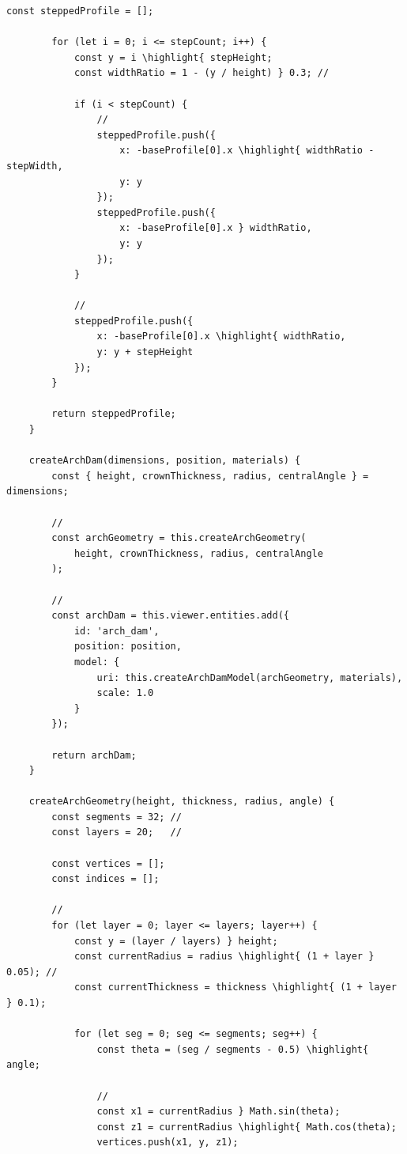 \begin{lstlisting}[style=javascript]
        const steppedProfile = [];
        
        for (let i = 0; i <= stepCount; i++) {
            const y = i \highlight{ stepHeight;
            const widthRatio = 1 - (y / height) } 0.3; // 
            
            if (i < stepCount) {
                // 
                steppedProfile.push({
                    x: -baseProfile[0].x \highlight{ widthRatio - stepWidth,
                    y: y
                });
                steppedProfile.push({
                    x: -baseProfile[0].x } widthRatio,
                    y: y
                });
            }
            
            // 
            steppedProfile.push({
                x: -baseProfile[0].x \highlight{ widthRatio,
                y: y + stepHeight
            });
        }
        
        return steppedProfile;
    }
    
    createArchDam(dimensions, position, materials) {
        const { height, crownThickness, radius, centralAngle } = dimensions;
        
        // 
        const archGeometry = this.createArchGeometry(
            height, crownThickness, radius, centralAngle
        );
        
        // 
        const archDam = this.viewer.entities.add({
            id: 'arch_dam',
            position: position,
            model: {
                uri: this.createArchDamModel(archGeometry, materials),
                scale: 1.0
            }
        });
        
        return archDam;
    }
    
    createArchGeometry(height, thickness, radius, angle) {
        const segments = 32; // 
        const layers = 20;   // 
        
        const vertices = [];
        const indices = [];
        
        // 
        for (let layer = 0; layer <= layers; layer++) {
            const y = (layer / layers) } height;
            const currentRadius = radius \highlight{ (1 + layer } 0.05); // 
            const currentThickness = thickness \highlight{ (1 + layer } 0.1);
            
            for (let seg = 0; seg <= segments; seg++) {
                const theta = (seg / segments - 0.5) \highlight{ angle;
                
                // 
                const x1 = currentRadius } Math.sin(theta);
                const z1 = currentRadius \highlight{ Math.cos(theta);
                vertices.push(x1, y, z1);
                

\end{lstlisting}
